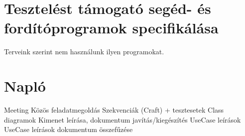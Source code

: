 \documentclass[../../projlab]{subfiles}
\begin{document}
\section{Tesztelést támogató segéd- és fordítóprogramok specifikálása}
Terveink szerint nem használunk ilyen programokat.


\section{Napló}

\begin{naplo}
	{ 
		Meeting 
	}
	{ 
		Közös feladatmegoldás
	}
	{ 
		Szekvenciák (Craft) + tesztesetek
	}
	{ 
		Class diagramok
	}
	{ 
		Kimenet leírása, dokumentum javítás/kiegészítés
	}
	{ 
		UseCase leírások
	}
	{ 
		UseCase leírások dokumentum összefűzése
	}
\end{naplo}
\end{document}
